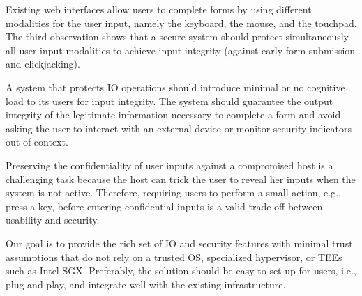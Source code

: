 Existing web interfaces allow users to complete forms by using different modalities for the user input, namely the keyboard, the mouse, and the touchpad. The third observation shows that a secure system should protect simultaneously all user input modalities to achieve input integrity (against early-form submission and clickjacking).


A system that protects IO operations should introduce minimal or no cognitive load to its users for input integrity.
The system should guarantee the output integrity of the legitimate information necessary to complete a form and avoid asking the user to interact with an external device or monitor security indicators out-of-context.


 Preserving the confidentiality of user inputs against a compromised host is a challenging task because the host can trick the user to reveal her inputs when the system is not active. Therefore, requiring users to perform a small action, e.g., press a key, before entering confidential inputs is a valid trade-off between usability and security.


Our goal is to provide the rich set of IO and security features with minimal trust assumptions that do not rely on a trusted OS, specialized hypervisor, or TEEs such as Intel SGX. Preferably, the solution should be easy to set up for users, i.e., plug-and-play, and integrate well with the existing infrastructure.  
